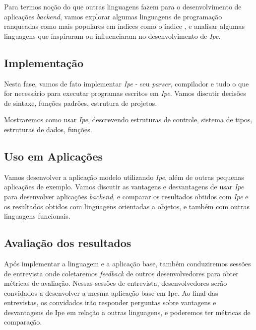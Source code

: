 Para termos noção do que outras linguagens fazem para o desenvolvimento de
aplicações \textit{backend}, vamos explorar algumas linguagens de programação
ranqueadas como mais populares em índices como o índice \textcite{tiobeindex}, e analisar algumas
linguagens que inspiraram ou influenciaram no desenvolvimento de \textit{Ipe}.

\subsection{Implementação}

Nesta fase, vamos de fato implementar \textit{Ipe} - seu \textit{parser}, compilador
e tudo o que for necessário para executar programas escritos em \textit{Ipe}.
Vamos discutir decisões de sintaxe, funções padrões, estrutura de projetos.

Mostraremos como usar \textit{Ipe}, descrevendo estruturas de controle, sistema
de tipos, estruturas de dados, funções.

\subsection{Uso em Aplicações}

Vamos desenvolver a aplicação modelo utilizando \textit{Ipe}, além de outras
pequenas aplicações de exemplo. Vamos discutir as vantagens e desvantagens de
usar \textit{Ipe} para desenvolver aplicações \textit{backend}, e comparar os
resultados obtidos com \textit{Ipe} e os resultados obtidos com linguagens orientadas
a objetos, e também com outras linguagens funcionais.

\subsection{Avaliação dos resultados}

Após implementar a linguagem e a aplicação base, também conduziremos sessões
de entrevista onde coletaremos \textit{feedback} de outros desenvolvedores para
obter métricas de avaliação. Nessas sessões de entrevista, desenvolvedores serão
convidados a desenvolver a mesma aplicação base em Ipe. Ao final das entrevistas,
os convidados irão responder perguntas sobre vantagens e desvantagens de Ipe em
relação a outras linguagens, e poderemos ter métricas de comparação.
